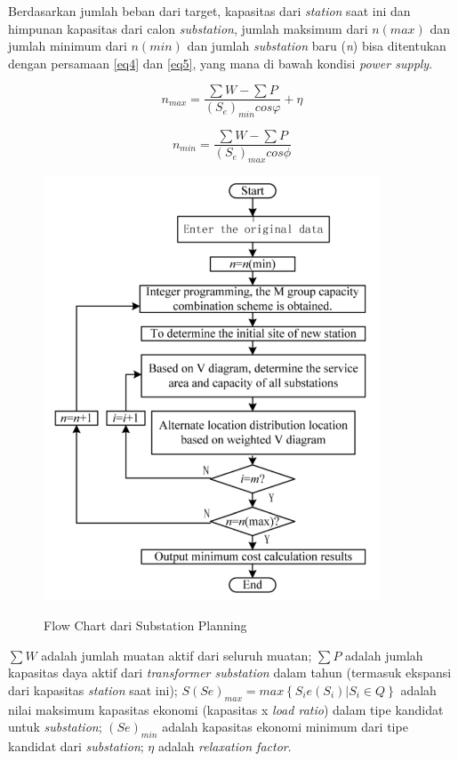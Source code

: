 Berdasarkan jumlah beban dari target, kapasitas dari \textit{station} saat ini dan himpunan kapasitas dari calon \textit{substation}, jumlah maksimum dari $n\left(max\right)$ dan jumlah minimum dari $n\left(min\right)$ dan jumlah \textit{substation} baru (\textit{n}) bisa ditentukan dengan persamaan \ref{eq4} dan \ref{eq5}, yang mana di bawah kondisi \textit{power supply}.

\begin{equation} \label{eq4}
	n_{max} = \frac{\sum W - \sum P}{\left ( S_{e} \right)_{min} cos \varphi} + \eta
\end{equation}

\begin{equation} \label{eq5}
	n_{min} = \frac{\sum W - \sum P}{\left ( S_{e} \right)_{max} cos \phi}
\end{equation}

\begin{figure}
	\centering
	\includegraphics[width=10cm]{pics/substationPlanning.png}
	\caption{Flow Chart dari Substation Planning}
	\label{fig:substationPlanning}
	\cite{substation}
\end{figure}

$\sum W$ adalah jumlah muatan aktif dari seluruh muatan; $\sum P$ adalah jumlah kapasitas daya aktif dari \textit{transformer substation} dalam tahun (termasuk ekspansi dari kapasitas \textit{station} saat ini); $S\left(Se\right)_{max} = max\left \{S_{i}e \left(S_{i}\right) | S_{i} \in Q \right \}$ adalah nilai maksimum kapasitas ekonomi (kapasitas x \textit{load ratio}) dalam tipe kandidat untuk \textit{substation}; $\left(Se\right)_{min}$ adalah kapasitas ekonomi minimum dari tipe kandidat dari \textit{substation}; $\eta$ adalah \textit{relaxation factor}.

